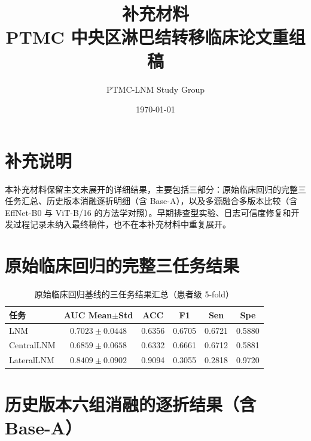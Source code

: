 \documentclass[12pt,a4paper]{ctexart}
\title{补充材料\\PTMC 中央区淋巴结转移临床论文重组稿}
\author{PTMC-LNM Study Group}
\date{\today}
\begin{document}
\maketitle

\section{补充说明}
本补充材料保留主文未展开的详细结果，主要包括三部分：原始临床回归的完整三任务汇总、历史版本消融逐折明细（含 Base-A），以及多源融合多版本比较（含 EffNet-B0 与 ViT-B/16 的方法学对照）。早期排查型实验、日志可信度修复和开发过程记录未纳入最终稿件，也不在本补充材料中重复展开。

\section{原始临床回归的完整三任务结果}
\begin{table}[H]
\centering
\caption{原始临床回归基线的三任务结果汇总（患者级 5-fold）}
\label{tab:supp_raw_clinical_all}
\small
\begin{tabular}{lccccc}
\toprule
任务 & AUC Mean$\pm$Std & ACC & F1 & Sen & Spe \\
\midrule
LNM & $0.7023\pm0.0448$ & 0.6356 & 0.6705 & 0.6721 & 0.5880 \\
CentralLNM & $0.6859\pm0.0658$ & 0.6332 & 0.6661 & 0.6712 & 0.5881 \\
LateralLNM & $0.8409\pm0.0902$ & 0.9094 & 0.3055 & 0.2818 & 0.9720 \\
\bottomrule
\end{tabular}
\end{table}

\section{历史版本六组消融的逐折结果（含 Base-A）}






\end{document}
